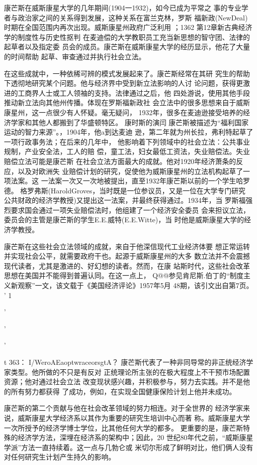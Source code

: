 康芒斯在威斯康星大学的几年期间(1904一1932)，如今已成为平常之
事的专业学者与政治家之间的关系得到发展，这种关系在富兰克林，罗斯
福新政(NewDeal)时期在全国范围内再次出现。威斯康星州政府广泛利用
；1362
第12章新古典经济学的制度性与历史性抠判
在麦迪偿的大学教职员工充当新思想的智守团、法律的起草者以及指定委
员会的成员。康芒斯在威斯康星大学的经历显示，他花了大量的时间帮助
起草、审查通过并执行社会立法。

在这些成就中，一种依稀可辨的模式发展起来了。康芒斯经常在其研
究生的帮助下透彻地研究某个问题。他与经济界中受到新立法影响的人讨
论问题，获得更激进的工商界人士或工人领袖的支持。法律通过之后，他
四处游说，使用其他手段推动新立法向其他州传播。体现在罗斯福新政社
会立法中的很多思想来自于威斯康星州，这一点很少有人怀疑。毫无疑问，
1932年，很多在麦迪逊接受培养的经济学家和其他人都搬到了华盛顿特区。
康时斯的演闫
康芒斯被描述为“福利国家运动的智力来源”。，1904年，他a到达麦迪
逊，第二年就为州长拉，弗利特起草了一项行政事务法；在后来的几年中，
他影响着下列领域中的社会立法：公共事业规制，产业安全法，工人的赔
偿，童工法，妇女最低工资法，失业赔偿法。失业赔偿立法可能是康芒斯
在社会立法方面最大的成就。他对1920年经济萧条的反应，以及对欧洲失
业赔偿计划的研究，促使他为威斯康星州的立法机构起草了一项法案。这
一法案一次又一次地被提出，直至1932年康芒斯以前的一个学生哈罗德。
格罗弗斯(HaroldGroves，当时既是一位参议员，又是一位在大学专门研究
公共财政的经济学教授)又提出这一法案，并最终获得通过。1934年，当
罗斯福强烈要求国会通过一项失业赔偿法时，他组建了一个经济安全委员
会来担议立法，委员会的主管是康芒斯的学生E.E.威特(E.E.Witte)，当
时他是威斯康星大学的经济学教授。

康芒斯在这些社会立法领域的成就，来自于他深信现代工业经济体要
想正常运转并实现社会公平，就需要政府干也。起源于威斯康星州的大多
数立法并不会震撼现代读者，尤其是激进的、好幻想的读者。然而，在康
站斯时代，这些社会改革思想在美国并不能得到普遍认同。在这一点上，
Q@@参见肯尼斯.伯丁的“制度主义新观察”一文，该文载于《美国经济评论》1957年5月
48期，该引文出自第7页。
'
1

'

'

'

t
363：
I/WeroAEaoptwraceorsgtA？
康芒斯代表了一种非同导常的非正统经济学家类型。他所做的不只是有反对
正统理论所主张的在极大程度上不干预市场配置资源；他对通过社会立法
改变现状感兴趣，并积极参与，努力去实践。并不是他的所有努力都获得
了成功，例如，在实现全国健康保险计划上他并未成功。

康芒斯的第二个贡献与他在社会改革领域的努力相连。对于全世界的
经济学家来说，威斯康星大学经济系以其作为重要的研究生培训中心而著
称。威斯康星大学一次所授予的经济学博士学位，比其他任何大学的都多。
更重要的是，康芒斯特殊的经济学方法，深埋在经济系的架构中；因此，20
世纪80年代之前，“威斯康星学派”方法一直持续着。这一点与几勃仑或
米切尔形成了鲜明对比，他们俩人没有对任何研究生计划产生持久的影响。

